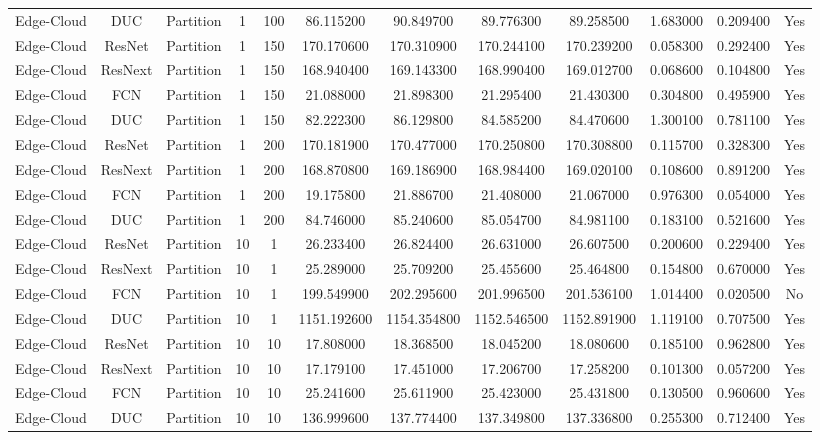 \begin{tabular}{|c||c||c||c||c||c||c||c||c||c||c||c|}
Edge-Cloud & DUC & Partition & 1 & 100 & 86.115200 & 90.849700 & 89.776300 & 89.258500 & 1.683000 & 0.209400 & Yes \\
Edge-Cloud & ResNet & Partition & 1 & 150 & 170.170600 & 170.310900 & 170.244100 & 170.239200 & 0.058300 & 0.292400 & Yes \\
Edge-Cloud & ResNext & Partition & 1 & 150 & 168.940400 & 169.143300 & 168.990400 & 169.012700 & 0.068600 & 0.104800 & Yes \\
Edge-Cloud & FCN & Partition & 1 & 150 & 21.088000 & 21.898300 & 21.295400 & 21.430300 & 0.304800 & 0.495900 & Yes \\
Edge-Cloud & DUC & Partition & 1 & 150 & 82.222300 & 86.129800 & 84.585200 & 84.470600 & 1.300100 & 0.781100 & Yes \\
Edge-Cloud & ResNet & Partition & 1 & 200 & 170.181900 & 170.477000 & 170.250800 & 170.308800 & 0.115700 & 0.328300 & Yes \\
Edge-Cloud & ResNext & Partition & 1 & 200 & 168.870800 & 169.186900 & 168.984400 & 169.020100 & 0.108600 & 0.891200 & Yes \\
Edge-Cloud & FCN & Partition & 1 & 200 & 19.175800 & 21.886700 & 21.408000 & 21.067000 & 0.976300 & 0.054000 & Yes \\
Edge-Cloud & DUC & Partition & 1 & 200 & 84.746000 & 85.240600 & 85.054700 & 84.981100 & 0.183100 & 0.521600 & Yes \\
Edge-Cloud & ResNet & Partition & 10 & 1 & 26.233400 & 26.824400 & 26.631000 & 26.607500 & 0.200600 & 0.229400 & Yes \\
Edge-Cloud & ResNext & Partition & 10 & 1 & 25.289000 & 25.709200 & 25.455600 & 25.464800 & 0.154800 & 0.670000 & Yes \\
Edge-Cloud & FCN & Partition & 10 & 1 & 199.549900 & 202.295600 & 201.996500 & 201.536100 & 1.014400 & 0.020500 & No \\
Edge-Cloud & DUC & Partition & 10 & 1 & 1151.192600 & 1154.354800 & 1152.546500 & 1152.891900 & 1.119100 & 0.707500 & Yes \\
Edge-Cloud & ResNet & Partition & 10 & 10 & 17.808000 & 18.368500 & 18.045200 & 18.080600 & 0.185100 & 0.962800 & Yes \\
Edge-Cloud & ResNext & Partition & 10 & 10 & 17.179100 & 17.451000 & 17.206700 & 17.258200 & 0.101300 & 0.057200 & Yes \\
Edge-Cloud & FCN & Partition & 10 & 10 & 25.241600 & 25.611900 & 25.423000 & 25.431800 & 0.130500 & 0.960600 & Yes \\
Edge-Cloud & DUC & Partition & 10 & 10 & 136.999600 & 137.774400 & 137.349800 & 137.336800 & 0.255300 & 0.712400 & Yes \\

\end{tabular}

